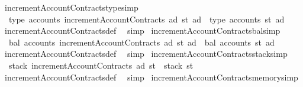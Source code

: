 \begin{isabellebody}
\isanewline
{}\isamarkupfalse%
\ incrementAccountContracts{\isacharunderscore}{\kern0pt}type{\isacharbrackleft}{\kern0pt}simp{\isacharbrackright}{\kern0pt}{\isacharcolon}{\kern0pt}\isanewline
\ \ {\isachardoublequoteopen}type\ {\isacharparenleft}{\kern0pt}accounts\ {\isacharparenleft}{\kern0pt}incrementAccountContracts\ ad\ st{\isacharparenright}{\kern0pt}\ ad{\isacharprime}{\kern0pt}{\isacharparenright}{\kern0pt}\ {\isacharequal}{\kern0pt}\ type\ {\isacharparenleft}{\kern0pt}accounts\ st\ ad{\isacharprime}{\kern0pt}{\isacharparenright}{\kern0pt}{\isachardoublequoteclose}\isanewline
%
\isadelimproof
\ \ %
\endisadelimproof
%
\isatagproof
{}\isamarkupfalse%
\ incrementAccountContracts{\isacharunderscore}{\kern0pt}def\ \isamarkupfalse%
\ simp%
\endisatagproof
{\isafoldproof}%
%
\isadelimproof
\isanewline
%
\endisadelimproof
\isanewline
{}\isamarkupfalse%
\ incrementAccountContracts{\isacharunderscore}{\kern0pt}bal{\isacharbrackleft}{\kern0pt}simp{\isacharbrackright}{\kern0pt}{\isacharcolon}{\kern0pt}\isanewline
\ \ {\isachardoublequoteopen}bal\ {\isacharparenleft}{\kern0pt}accounts\ {\isacharparenleft}{\kern0pt}incrementAccountContracts\ ad\ st{\isacharparenright}{\kern0pt}\ ad{\isacharprime}{\kern0pt}{\isacharparenright}{\kern0pt}\ {\isacharequal}{\kern0pt}\ bal\ {\isacharparenleft}{\kern0pt}accounts\ st\ ad{\isacharprime}{\kern0pt}{\isacharparenright}{\kern0pt}{\isachardoublequoteclose}\isanewline
%
\isadelimproof
\ \ %
\endisadelimproof
%
\isatagproof
{}\isamarkupfalse%
\ incrementAccountContracts{\isacharunderscore}{\kern0pt}def\ \isamarkupfalse%
\ simp%
\endisatagproof
{\isafoldproof}%
%
\isadelimproof
\isanewline
%
\endisadelimproof
\isanewline
{}\isamarkupfalse%
\ incrementAccountContracts{\isacharunderscore}{\kern0pt}stack{\isacharbrackleft}{\kern0pt}simp{\isacharbrackright}{\kern0pt}{\isacharcolon}{\kern0pt}\isanewline
\ \ {\isachardoublequoteopen}stack\ {\isacharparenleft}{\kern0pt}incrementAccountContracts\ ad\ st{\isacharparenright}{\kern0pt}\ {\isacharequal}{\kern0pt}\ stack\ st{\isachardoublequoteclose}\isanewline
%
\isadelimproof
\ \ %
\endisadelimproof
%
\isatagproof
{}\isamarkupfalse%
\ incrementAccountContracts{\isacharunderscore}{\kern0pt}def\ \isamarkupfalse%
\ simp%
\endisatagproof
{\isafoldproof}%
%
\isadelimproof
\isanewline
%
\endisadelimproof
\isanewline
{}\isamarkupfalse%
\ incrementAccountContracts{\isacharunderscore}{\kern0pt}memory{\isacharbrackleft}{\kern0pt}simp{\isacharbrackright}{\kern0pt}{\isacharcolon}{\kern0pt}\isanewline

\end{isabellebody}
